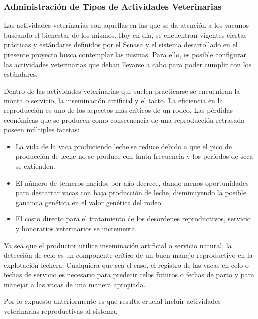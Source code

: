 \documentclass[11pt,oneside]{book}
\begin{document}
\newpage
\subsubsection{Administración de Tipos de Actividades Veterinarias}
Las actividades veterinarias son aquellas en las que se da atención a los vacunos buscando el bienestar de los mismos. Hoy en día, se encuentran vigentes ciertas prácticas y estándares definidos por el Senasa y el sistema desarrollado en el presente proyecto busca contemplar las mismas. Para ello, es posible configurar las actividades veterinarias que deban llevarse a cabo para poder cumplir con los estándares.

Dentro de las actividades veterinarias que suelen practicarse se encuentran la monta o servicio, la inseminación artificial y el tacto. La eficiencia en la reproducción es uno de los aspectos más críticos de un rodeo. Las pérdidas económicas que se producen como consecuencia de una reproducción retrasada poseen múltiples facetas:
\begin{itemize}
\item La vida de la vaca produciendo leche se reduce debido a que el pico de producción de leche no se produce con tanta frecuencia y los períodos de seca se extienden.
\item El número de terneros nacidos por año decrece, dando menos oportunidades para descartar vacas con baja producción de leche, disminuyendo la posible ganancia genética en el valor genético del rodeo.
\item El costo directo para el tratamiento de los desordenes reproductivos, servicio y honorarios veterinarios se incrementa.
\end{itemize}

Ya sea que el productor utilice inseminación artificial o servicio natural, la detección de celo es un componente crítico de un buen manejo reproductivo en la explotación lechera. Cualquiera que sea el caso, el registro de las vacas en celo o fechas de servicio es necesario para predecir celos futuros o fechas de parto y para manejar a las vacas de una manera apropiada.

Por lo expuesto anteriormente es que resulta crucial incluir actividades veterinarias reproductivas al sistema.

%
\end{document}
